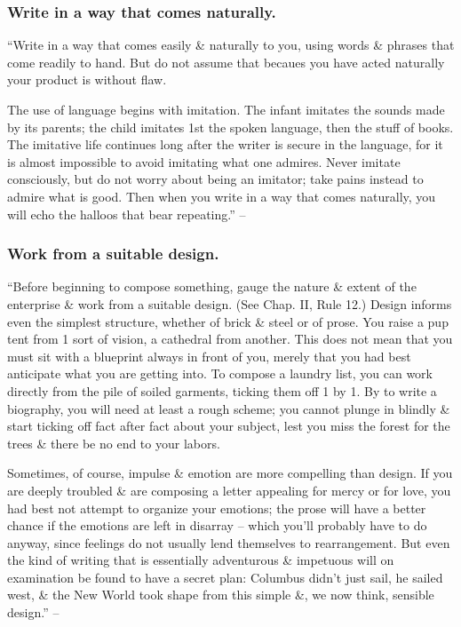 \documentclass{article}
\begin{document}
\subsubsection{Write in a way that comes naturally.}
``Write in a way that comes easily \& naturally to you, using words \& phrases that come readily to hand. But do not assume that becaues you have acted naturally your product is without flaw.

The use of language begins with imitation. The infant imitates the sounds made by its parents; the child imitates 1st the spoken language, then the stuff of books. The imitative life continues long after the writer is secure in the language, for it is almost impossible to avoid imitating what one admires. Never imitate consciously, but do not worry about being an imitator; take pains instead to admire what is good. Then when you write in a way that comes naturally, you will echo the halloos that bear repeating.'' -- \cite[p. 79]{Strunk_White_element_style}


\subsubsection{Work from a suitable design.}
``Before beginning to compose something, gauge the nature \& extent of the enterprise \& work from a suitable design. (See Chap. II, Rule 12.) Design informs even the simplest structure, whether of brick \& steel or of prose. You raise a pup tent from 1 sort of vision, a cathedral from another. This does not mean that you must sit with a blueprint always in front of you, merely that you had best anticipate what you are getting into. To compose a laundry list, you can work directly from the pile of soiled garments, ticking them off 1 by 1. By to write a biography, you will need at least a rough scheme; you cannot plunge in blindly \& start ticking off fact after fact about your subject, lest you miss the forest for the trees \& there be no end to your labors.

Sometimes, of course, impulse \& emotion are more compelling than design. If you are deeply troubled \& are composing a letter appealing for mercy or for love, you had best not attempt to organize your emotions; the prose will have a better chance if the emotions are left in disarray -- which you'll probably have to do anyway, since feelings do not usually lend themselves to rearrangement. But even the kind of writing that is essentially adventurous \& impetuous will on examination be found to have a secret plan: Columbus didn't just sail, he sailed west, \& the New World took shape from this simple \&, we now think, sensible design.'' -- \cite[p. 80]{Strunk_White_element_style}
\end{document}
